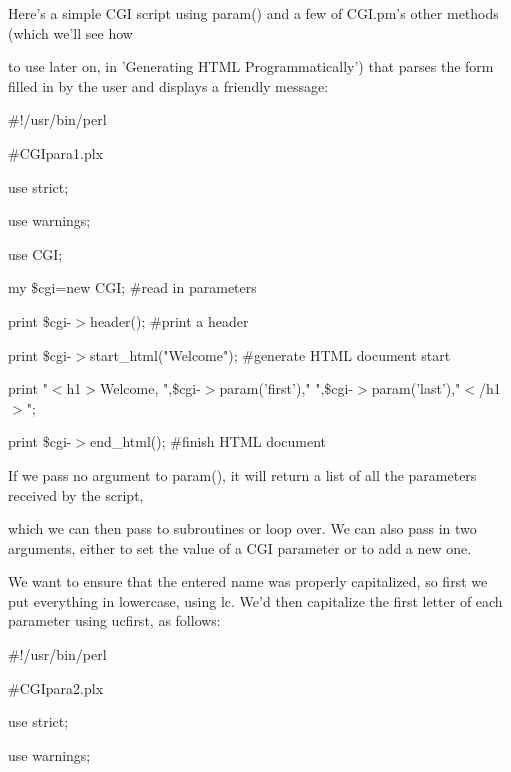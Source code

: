 \documentclass[a4paper,11pt]{book}
\begin{document}
\noindent 

\noindent Here's a simple CGI script using param() and a few of CGI.pm's other methods (which we'll see how

\noindent to use later on, in 'Generating HTML Programmatically') that parses the form filled in by the user and displays a friendly message:

\noindent 

\noindent 

\noindent \#!/usr/bin/perl

\noindent \#CGIpara1.plx

\noindent use strict;

\noindent use warnings;

\noindent 

\noindent use CGI;

\noindent 

\noindent my \$cgi=new CGI; \#read in parameters

\noindent 

\noindent print \$cgi-$>$header(); \#print a header

\noindent print \$cgi-$>$start\_html("Welcome"); \#generate HTML document start

\noindent print "$<$h1$>$Welcome, ",\$cgi-$>$param('first')," ",\$cgi-$>$param('last'),"$<$/h1$>$";

\noindent print \$cgi-$>$end\_html(); \#finish HTML document

\noindent 

\noindent 

\noindent If we pass no argument to param(), it will return a list of all the parameters received by the script,

\noindent which we can then pass to subroutines or loop over. We can also pass in two arguments, either to set the value of a CGI parameter or to add a new one.

\noindent 

\noindent We want to ensure that the entered name was properly capitalized, so first we put everything in lowercase, using lc. We'd then capitalize the first letter of each parameter using ucfirst, as follows:

\noindent 

\noindent 

\noindent \#!/usr/bin/perl

\noindent \#CGIpara2.plx

\noindent use strict;

\noindent use warnings;
\end{document}

